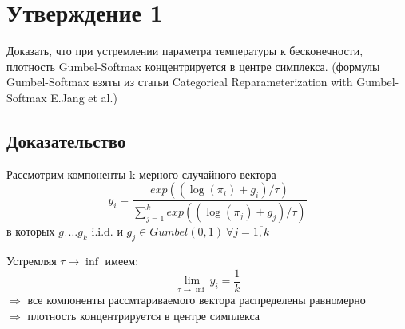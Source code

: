 \documentclass[a4paper,12pt,notitlepage]{article}
\begin{document}

\section*{Утверждение 1}
Доказать, что при устремлении параметра температуры к бесконечности, плотность
Gumbel-Softmax концентрируется в центре симплекса.
(формулы Gumbel-Softmax взяты из статьи Categorical Reparameterization with Gumbel-Softmax
E.Jang et al.)

\subsection*{Доказательство}
Рассмотрим компоненты k-мерного случайного вектора
$$
y_i = \frac{exp((\log(\pi_i) + g_i)/\tau )}{\sum_{j = 1}^kexp((\log(\pi_j ) + g_j )/\tau)}$$
в которых $g_1\dots g_k$ i.i.d. и $g_j \in Gumbel(0,1) \ \forall j=\overline{1, k}$

Устремляя $\tau\rightarrow\inf$ имеем:
$$\lim_{\tau \rightarrow \inf}y_i = \frac{1}{k}$$
$\Longrightarrow$ все компоненты рассмтариваемого вектора распределены равномерно\\ $\Longrightarrow$ плотность концентрируется в центре симплекса 
\end{document}
